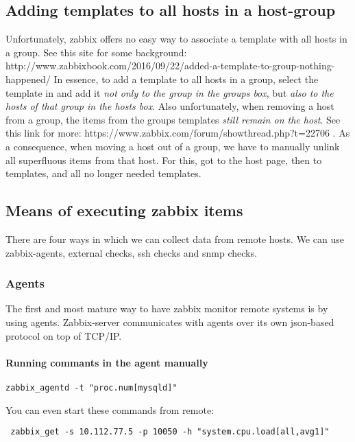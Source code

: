 \subsection{Adding templates to all hosts in a host-group}
Unfortunately, zabbix offers no easy way to associate a template with all hosts in a group. See this site for some background: http://www.zabbixbook.com/2016/09/22/added-a-template-to-group-nothing-happened/
In essence, to add a template to all hosts in a group, select the template in   and add it \emph{not only to the group in the groups box}, but \emph{also to the hosts of that group in the hosts box}.
Also unfortunately, when removing a host from a group, the items from the groups templates \emph{still remain on the host}. See this link for more: https://www.zabbix.com/forum/showthread.php?t=22706 . As a consequence, when moving a host out of a group, we have to manually unlink all superfluous items from that host. For this, got to the host page, then to templates, and  all no longer needed templates. 

\subsection{Means of executing zabbix items}

There are four ways in which we can collect data from remote hosts. We can use zabbix-agents, external checks, ssh checks and snmp checks.

\subsubsection{Agents}
The first and most mature way to have zabbix monitor remote systems is by using agents. Zabbix-server communicates with agents over its own json-based protocol on top of TCP/IP.

\paragraph{Running commants in the agent manually}
\begin{lstlisting}
zabbix_agentd -t "proc.num[mysqld]"
\end{lstlisting}
 You can even start these commands from remote: 
 \begin{lstlisting}
 zabbix_get -s 10.112.77.5 -p 10050 -h "system.cpu.load[all,avg1]"
 \end{lstlisting}

